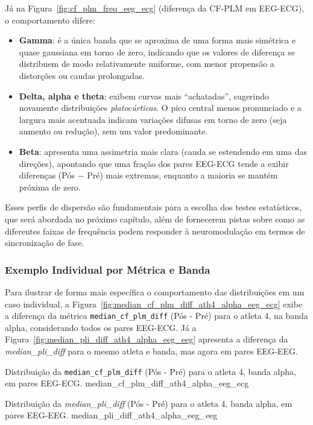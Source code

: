 Já na Figura~\ref{fig:cf_plm_freq_eeg_ecg} (diferença da CF-PLM em EEG-ECG), o comportamento difere:
\begin{itemize}
    \item \textbf{Gamma}: é a única banda que se aproxima de uma forma mais simétrica e quase gaussiana em torno de zero, indicando que os valores de diferença se distribuem de modo relativamente uniforme, com menor propensão a distorções ou caudas prolongadas.
    \item \textbf{Delta, alpha e theta}: exibem curvas mais ``achatadas'', sugerindo novamente distribuições \emph{platocúrticas}. O pico central menos pronunciado e a largura mais acentuada indicam variações difusas em torno de zero (seja aumento ou redução), sem um valor predominante.
    \item \textbf{Beta}: apresenta uma assimetria mais clara (cauda se estendendo em uma das direções), apontando que uma fração dos pares EEG-ECG tende a exibir diferenças (Pós $-$ Pré) mais extremas, enquanto a maioria se mantém próxima de zero.
\end{itemize}

Esses perfis de dispersão são fundamentais para a escolha dos testes estatísticos, que será abordada no próximo capítulo, além de fornecerem pistas sobre como as diferentes faixas de frequência podem responder à neuromodulação em termos de sincronização de fase.

\subsubsection{Exemplo Individual por Métrica e Banda}
Para ilustrar de forma mais específica o comportamento das distribuições em um caso individual, a Figura~\ref{fig:median_cf_plm_diff_ath4_alpha_eeg_ecg} exibe a diferença da métrica \texttt{median\_cf\_plm\_diff} (Pós - Pré) para o atleta 4, na banda alpha, considerando todos os pares EEG-ECG. Já a Figura~\ref{fig:median_pli_diff_ath4_alpha_eeg_eeg} apresenta a diferença da \textit{median\_pli\_diff} para o mesmo atleta e banda, mas agora em pares EEG-EEG.

{}
{Distribuição da \texttt{median\_cf\_plm\_diff} (Pós - Pré) para o atleta 4, banda alpha, em pares EEG-ECG.}
{median_cf_plm_diff_ath4_alpha_eeg_ecg}

{Distribuição da \textit{median\_pli\_diff} (Pós - Pré) para o atleta 4, banda alpha, em pares EEG-EEG.}
{median_pli_diff_ath4_alpha_eeg_eeg}

